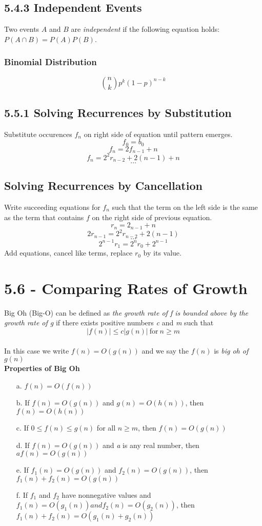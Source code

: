 \documentclass[10pt,twocolumn]{article}
\begin{document}
	\subsection*{5.4.3 Independent Events}
	
	Two events $A$ and $B$ are \emph{independent} if the following
        equation holds: $P(A \cap B)=P(A)P(B)$.
	
	\subsubsection*{Binomial Distribution}
	\[\binom{n}{k}p^k(1-p)^{n-k}\]

	\subsection*{5.5.1 Solving Recurrences by Substitution}
	Substitute occurences $f_n$ on right side of equation until pattern emerges.
		\[f_0=b_0\]
		\[f_n=2f_{n-1}+n\]
		\[f_n=2^2r_{n-2}+2(n-1)+n\]
		\[\ldots\]
	
	\subsection*{Solving Recurrences by Cancellation}
	Write succeeding equations for $f_n$ such that the term on the left side is the same as the term that contains $f$ on the right side of previous equation.
		\[r_n=2_{n-1}+n\]
		\[2r_{n-1}=2^2r_{n-2}+2(n-1)\]
		\[\ldots\]
		\[2^{n-1}r_1=2^nr_0+2^{n-1}\]
	Add equations, cancel like terms, replace $r_0$ by its value.
	
	\section*{5.6 - Comparing Rates of Growth}
        Big Oh (Big-O) can be defined as \textit{the growth rate of f is
          bounded above by the growth rate of g} if there exists positive
        numbers \textit{c} and \textit{m} such that \\
        \[ |f(n)| \leq c|g(n)| \: \textrm{for}\: n\geq m\]\\
        In this case we write $f(n) = O(g(n))$ and we say the $f(n)$ is \textit{big oh of $g(n)$}\\
        \textbf{Properties of Big Oh}\\
        \begin{itemize}
        \item[a.] $f(n)=O(f(n))$
        \item[b.] If $f(n)=O(g(n))$ and $ g(n)=O(h(n))$, then $f(n)=O(h(n))$
        \item[c.] If $0\leq f(n) \leq g(n)$ for all $n \geq m$, then $f(n)=O(g(n))$
        \item[d.] If $f(n)=O(g(n))$ and \textit{a} is any real number, then $af(n)=O(g(n))$
        \item[e.] If $f_1(n)=O(g(n))$ and $f_2(n)=O(g(n))$, then $f_1(n) + f_2(n) = O(g(n))$
        \item[f.] If $f_1$ and $f_2$ have nonnegative values and
          $f_1(n) = O(g_1(n)) and f_2(n) = O(g_2(n))$, then $f_1(n) +
          f_2(n) = O(g_1(n) + g_2(n))$
	\end{itemize}
\end{document}
